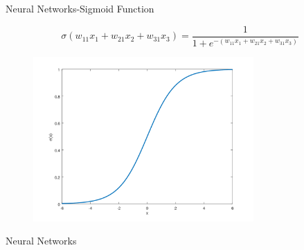 \documentclass{beamer}
\begin{document}
\begin{frame}{Neural Networks-Sigmoid Function} 

    \[
    \displaystyle \sigma(w_{11}x_1 + w_{21}x_2 + w_{31}x_3) = \frac{1}{1 + e^{-(w_{11}x_1 + w_{21}x_2 + w_{31}x_3)}}
    \]
    \begin{figure}[h]
        \centering
        \includegraphics[width=0.75\textwidth]{Neural Network/sigmoid_function.png} %
        \captionsetup{labelformat=empty}
    \end{figure}
\end{frame}

\begin{frame}{Neural Networks} 
    \begin{figure}[h]
        \centering
        \captionsetup{labelformat=empty}
    \end{figure}
\end{frame}
\end{document}
